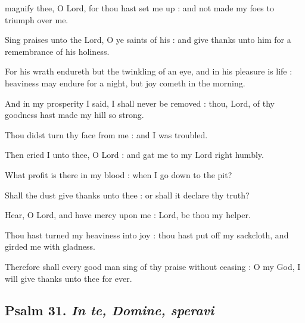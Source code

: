  magnify thee, O Lord, for thou hast set me up : and not made my foes to triumph over me.\par
{}
Sing praises unto the Lord, O ye saints of his : and give thanks unto him for a remembrance of his holiness.\par
{}For his wrath endureth but the twinkling of an eye, and in his pleasure is life : heaviness may endure for a night, but joy cometh in the morning.\par
{}And in my prosperity I said, I shall never be removed : thou, Lord, of thy goodness hast made my hill so strong.\par
{}Thou didst turn thy face from me : and I was troubled.\par
{}Then cried I unto thee, O Lord : and gat me to my Lord right humbly.\par
{}What profit is there in my blood : when I go down to the pit?\par
{}Shall the dust give thanks unto thee : or shall it declare thy truth?\par
{}Hear, O Lord, and have mercy upon me : Lord, be thou my helper.\par
{}Thou hast turned my heaviness into joy : thou hast put off my sackcloth, and girded me with gladness.\par
{}Therefore shall every good man sing of thy praise without ceasing : O my God, I will give thanks unto thee for ever.\par

\subsection{Psalm 31. \textit{In te, Domine, speravi}}


